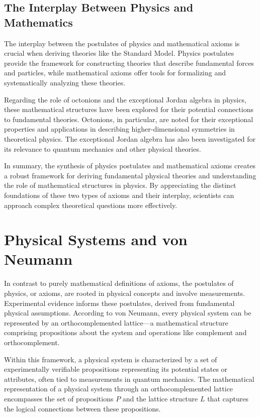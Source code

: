 \documentclass{article}
\begin{document}
\subsection{The Interplay Between Physics and Mathematics}

The interplay between the postulates of physics and mathematical axioms is crucial when deriving theories like the Standard Model. Physics postulates provide the framework for constructing theories that describe fundamental forces and particles, while mathematical axioms offer tools for formalizing and systematically analyzing these theories.

Regarding the role of octonions and the exceptional Jordan algebra in physics, these mathematical structures have been explored for their potential connections to fundamental theories. Octonions, in particular, are noted for their exceptional properties and applications in describing higher-dimensional symmetries in theoretical physics. The exceptional Jordan algebra has also been investigated for its relevance to quantum mechanics and other physical theories.

In summary, the synthesis of physics postulates and mathematical axioms creates a robust framework for deriving fundamental physical theories and understanding the role of mathematical structures in physics. By appreciating the distinct foundations of these two types of axioms and their interplay, scientists can approach complex theoretical questions more effectively.

\section{Physical Systems and von Neumann}

In contrast to purely mathematical definitions of axioms, the postulates of physics, or axioms, are rooted in physical concepts and involve measurements. Experimental evidence informs these postulates, derived from fundamental physical assumptions. According to von Neumann, every physical system can be represented by an orthocomplemented lattice—a mathematical structure comprising propositions about the system and operations like complement and orthocomplement.

Within this framework, a physical system is characterized by a set of experimentally verifiable propositions representing its potential states or attributes, often tied to measurements in quantum mechanics. The mathematical representation of a physical system through an orthocomplemented lattice encompasses the set of propositions \(P\) and the lattice structure \(L\) that captures the logical connections between these propositions.
\end{document}
